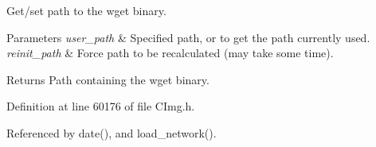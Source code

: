 Get/set path to the {\ttfamily wget} binary. 


\begin{DoxyParams}{Parameters}
{\em user\+\_\+path} & Specified path, or {} to get the path currently used. \\
\hline
{\em reinit\+\_\+path} & Force path to be recalculated (may take some time). \\
\hline
\end{DoxyParams}
\begin{DoxyReturn}{Returns}
Path containing the {\ttfamily wget} binary. 
\end{DoxyReturn}


Definition at line 60176 of file C\+Img.\+h.



Referenced by date(), and load\+\_\+network().

